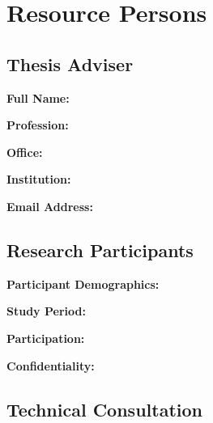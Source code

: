 \chapter{Resource Persons}

{\color{maroon}
\section{Thesis Adviser}
\begin{description}
    \item[\textbf{Full Name:}] \underline{\hspace{8cm}}
    \item[\textbf{Profession:}] \underline{\hspace{8cm}}
    \item[\textbf{Office:}] \underline{\hspace{8cm}}
    \item[\textbf{Institution:}] \underline{\hspace{8cm}}
    \item[\textbf{Email Address:}] \underline{\hspace{8cm}}
\end{description}

\section{Research Participants}
\begin{description}
    \item[\textbf{Participant Demographics:}] \underline{\hspace{8cm}}
    \item[\textbf{Study Period:}] \underline{\hspace{8cm}}
    \item[\textbf{Participation:}] \underline{\hspace{8cm}}
    \item[\textbf{Confidentiality:}] \underline{\hspace{8cm}}
\end{description}

\section{Technical Consultation}

}

